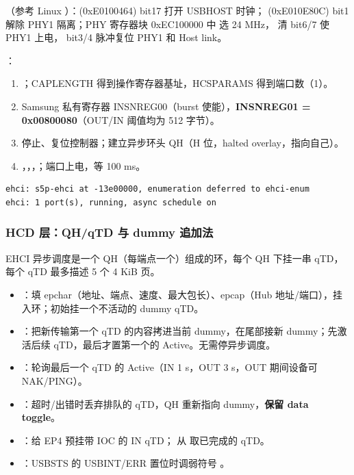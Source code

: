（参考 Linux ）：(0xE0100464) bit17 打开 USBHOST 时钟；
(0xE010E80C) bit1 解除 PHY1 隔离；PHY 寄存器块 0xEC100000 中  选 24 MHz，
 清 bit6/7 使 PHY1 上电， bit3/4 脉冲复位 PHY1 和 Host link。

：
\begin{enumerate}[leftmargin=2em,itemsep=0pt]
\item {}；CAPLENGTH 得到操作寄存器基址，HCSPARAMS 得到端口数（1）。
\item Samsung 私有寄存器 INSNREG00（burst 使能），\textbf{INSNREG01 = 0x00800080}（OUT/IN 阈值均为 512 字节）。
\item 停止、复位控制器；建立异步环头 QH（H 位，halted overlay，指向自己）。
\item {}，，，；端口上电，等 100 ms。
\end{enumerate}
\begin{lstlisting}[basicstyle=\ttfamily\small\color{tinygreen!70!black},backgroundcolor=\color{tinygreen!4}]
ehci: s5p-ehci at -13e00000, enumeration deferred to ehci-enum
ehci: 1 port(s), running, async schedule on
\end{lstlisting}

\subsubsection{HCD 层：QH/qTD 与 dummy 追加法}

EHCI 异步调度是一个 QH（每端点一个）组成的环，每个 QH 下挂一串 qTD，每个 qTD 最多描述 5 个 4 KiB 页。

\begin{itemize}[leftmargin=2em,itemsep=0pt]
\item {}：填 epchar（地址、端点、速度、最大包长）、epcap（Hub 地址/端口），挂入环；初始挂一个不活动的 dummy qTD。
\item {}：把新传输第一个 qTD 的内容拷进当前 dummy，在尾部接新 dummy；先激活后续 qTD，最后才置第一个的 Active。无需停异步调度。
\item {}：轮询最后一个 qTD 的 Active（IN 1 s，OUT 3 s，OUT 期间设备可 NAK/PING）。
\item {}：超时/出错时丢弃排队的 qTD，QH 重新指向 dummy，\textbf{保留 data toggle}。
\item {}：给 EP4 预挂带 IOC 的 IN qTD；\allowbreak{} 从  取已完成的 qTD。
\item {}：USBSTS 的 USBINT/ERR 置位时调弱符号 。
\end{itemize}

